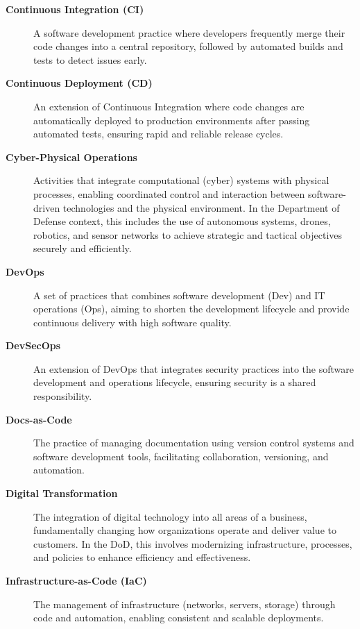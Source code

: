 \documentclass[11pt]{article}
\begin{document}
\begin{description}
    \item[\textbf{Continuous Integration (CI)}]
    A software development practice where developers frequently merge their code changes into a central repository, followed by automated builds and tests to detect issues early.

    \item[\textbf{Continuous Deployment (CD)}]
    An extension of Continuous Integration where code changes are automatically deployed to production environments after passing automated tests, ensuring rapid and reliable release cycles.

    \item[\textbf{Cyber-Physical Operations}]
    Activities that integrate computational (cyber) systems with physical processes, enabling coordinated control and interaction between software-driven technologies and the physical environment. In the Department of Defense context, this includes the use of autonomous systems, drones, robotics, and sensor networks to achieve strategic and tactical objectives securely and efficiently.

    \item[\textbf{DevOps}]
    A set of practices that combines software development (Dev) and IT operations (Ops), aiming to shorten the development lifecycle and provide continuous delivery with high software quality.

    \item[\textbf{DevSecOps}]
    An extension of DevOps that integrates security practices into the software development and operations lifecycle, ensuring security is a shared responsibility.

    \item[\textbf{Docs-as-Code}]
    The practice of managing documentation using version control systems and software development tools, facilitating collaboration, versioning, and automation.

    \item[\textbf{Digital Transformation}]
    The integration of digital technology into all areas of a business, fundamentally changing how organizations operate and deliver value to customers. In the DoD, this involves modernizing infrastructure, processes, and policies to enhance efficiency and effectiveness.

    \item[\textbf{Infrastructure-as-Code (IaC)}]
    The management of infrastructure (networks, servers, storage) through code and automation, enabling consistent and scalable deployments.


\end{description}
\end{document}
